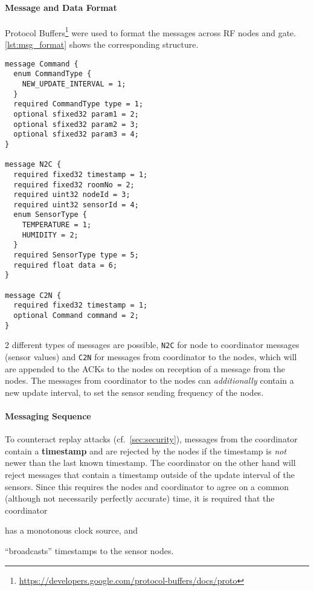 \paragraph{Message and Data Format}
\label{sec:msg_format}

Protocol Buffers\footnote{\url{https://developers.google.com/protocol-buffers/docs/proto}} were used to format the messages across RF nodes and gate. \cref{lst:msg_format} shows the corresponding structure.

\begin{lstlisting}[language=protobuf2,label=lst:msg_format,caption="Message Format as Protocol Buffer definition"]
message Command {
  enum CommandType {
    NEW_UPDATE_INTERVAL = 1;
  }
  required CommandType type = 1;
  optional sfixed32 param1 = 2;
  optional sfixed32 param2 = 3;
  optional sfixed32 param3 = 4;
}

message N2C {
  required fixed32 timestamp = 1;
  required fixed32 roomNo = 2;
  required uint32 nodeId = 3;
  required uint32 sensorId = 4;
  enum SensorType {
    TEMPERATURE = 1;
    HUMIDITY = 2;
  }
  required SensorType type = 5;
  required float data = 6;
}

message C2N {
  required fixed32 timestamp = 1;
  optional Command command = 2;
}
\end{lstlisting}

2 different types of messages are possible, \lstinline{N2C} for node to coordinator messages (sensor values) and \lstinline{C2N} for messages from coordinator to the nodes, which will are appended to the ACKs to the nodes on reception of a message from the nodes. The messages from coordinator to the nodes can \emph{additionally} contain a new update interval, to set the sensor sending frequency of the nodes.


\paragraph{Messaging Sequence}
\label{sec:msg_sequence}

To counteract replay attacks (cf.~\cref{sec:security}), messages from the coordinator contain a \textbf{timestamp} and are rejected by the nodes if the timestamp is \emph{not} newer than the last known timestamp. The coordinator on the other hand will reject messages that contain a timestamp outside of the update interval of the sensors. Since this requires the nodes and coordinator to agree on a common (although not necessarily perfectly accurate) time, it is required that the coordinator
\begin{itemize*}
  \item has a monotonous clock source, and
  \item ``broadcasts'' timestamps to the sensor nodes.
\end{itemize*}

